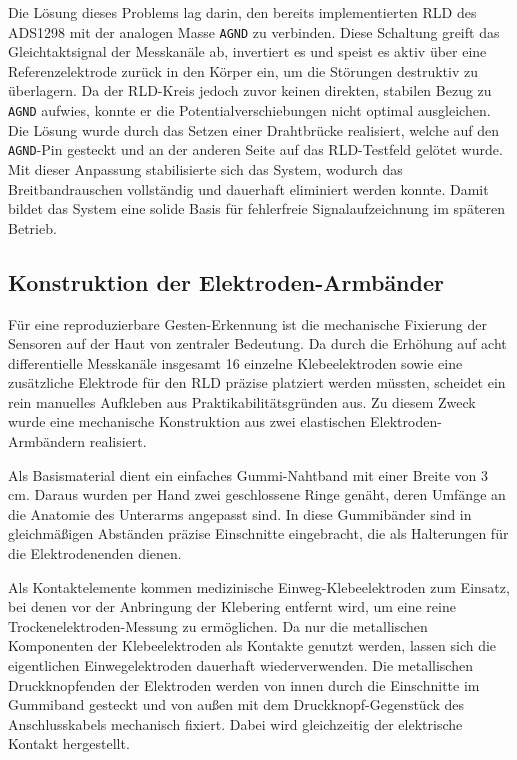         Die Lösung dieses Problems lag darin, den bereits implementierten \ac{RLD} des \textsf{ADS1298} mit der analogen Masse \texttt{AGND} zu verbinden. Diese Schaltung greift das Gleichtaktsignal der Messkanäle ab, invertiert es und speist es aktiv über eine Referenzelektrode zurück in den Körper ein, um die Störungen destruktiv zu überlagern. Da der \ac{RLD}-Kreis jedoch zuvor keinen direkten, stabilen Bezug zu \texttt{AGND} aufwies, konnte er die Potentialverschiebungen nicht optimal ausgleichen. Die Lösung wurde durch das Setzen einer Drahtbrücke realisiert, welche auf den \texttt{AGND}-Pin gesteckt und an der anderen Seite auf das \ac{RLD}-Testfeld gelötet wurde. Mit dieser Anpassung stabilisierte sich das System, wodurch das Breitbandrauschen vollständig und dauerhaft eliminiert werden konnte. Damit bildet das System eine solide Basis für fehlerfreie Signalaufzeichnung im späteren Betrieb.

    \subsection{Konstruktion der Elektroden-Armbänder}
        Für eine reproduzierbare Gesten-Erkennung ist die mechanische Fixierung der Sensoren auf der Haut von zentraler Bedeutung. Da durch die Erhöhung auf acht differentielle Messkanäle insgesamt 16 einzelne Klebeelektroden sowie eine zusätzliche Elektrode für den \ac{RLD} präzise platziert werden müssten, scheidet ein rein manuelles Aufkleben aus Praktikabilitätsgründen aus. Zu diesem Zweck wurde eine mechanische Konstruktion aus zwei elastischen Elektroden-Armbändern realisiert. 
        
        Als Basismaterial dient ein einfaches Gummi-Nahtband mit einer Breite von 3\,cm. Daraus wurden per Hand zwei geschlossene Ringe genäht, deren Umfänge an die Anatomie des Unterarms angepasst sind. In diese Gummibänder sind in gleichmäßigen Abständen präzise Einschnitte eingebracht, die als Halterungen für die Elektrodenenden dienen.

        Als Kontaktelemente kommen medizinische Einweg-Klebeelektroden zum Einsatz, bei denen vor der Anbringung der Klebering entfernt wird, um eine reine Trockenelektroden-Messung zu ermöglichen. Da nur die metallischen Komponenten der Klebeelektroden als Kontakte genutzt werden, lassen sich die eigentlichen Einwegelektroden dauerhaft wiederverwenden. Die metallischen Druckknopfenden der Elektroden werden von innen durch die Einschnitte im Gummiband gesteckt und von außen mit dem Druckknopf-Gegenstück des Anschlusskabels mechanisch fixiert. Dabei wird gleichzeitig der elektrische Kontakt hergestellt.

